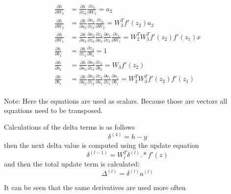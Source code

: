 \documentclass[11pt]{article}
\begin{document}
\begin{align*}
    \frac{\partial h}{\partial W_3} &=  \frac{\partial h}{\partial z_3} \frac{\partial z_3}{\partial W_3} = a_2 \\ 
    \frac{\partial h}{\partial W_2} &= \frac{\partial h}{\partial a_2}     \frac{\partial a_2}{\partial z_2}     \frac{\partial z_2}{\partial W_2} = W_3^T f'(z_2) a_2 \\
    \frac{\partial h}{\partial W_1} &= \frac{\partial h}{\partial a_2} \frac{\partial a_2}{\partial z_2} \frac{\partial z_2}{\partial a_1} \frac{\partial a_1}{\partial z_1} \frac{\partial z_1}{\partial W_1} = W_2^T W_3^T f'(z_2) f'(z_1)   x  \\
    \frac{\partial h}{\partial b_3} &=  \frac{\partial h}{\partial z_3} \frac{\partial z_3}{\partial b_3}  = 1 \\ 
    \frac{\partial h}{\partial b_2} &= \frac{\partial h}{\partial a_2}     \frac{\partial a_2}{\partial z_2}     \frac{\partial z_2}{\partial b_2} = W_3 f'(z_2)   \\
    \frac{\partial h}{\partial b_1} &= \frac{\partial h}{\partial a_2} \frac{\partial a_2}{\partial z_2} \frac{\partial z_2}{\partial a_1} \frac{\partial a_1}{\partial z_1} \frac{\partial a_1}{\partial b_1} =  W_2^T W_3^T  f'(z_2) f'(z_1)  \\
\end{align*}

Note: Here the equations are used as scalars. Because those are vectors all equations need to be transposed.


Calculations of the delta terms is as follows
\begin{equation}
    \delta^{(4)} = h - y 
\end{equation}
then the next delta value is computed using the update equation
\begin{equation}
    \delta^{(l-1)} = W_i^T \delta^{(l)} .* f'(z) 
\end{equation}
and then the total update term is calculated:
\begin{equation}
    \Delta^{(l)} = \delta^{(l)} a^{(l)}    
\end{equation}

It can be seen that the same derivatives are used more often
\end{document}
